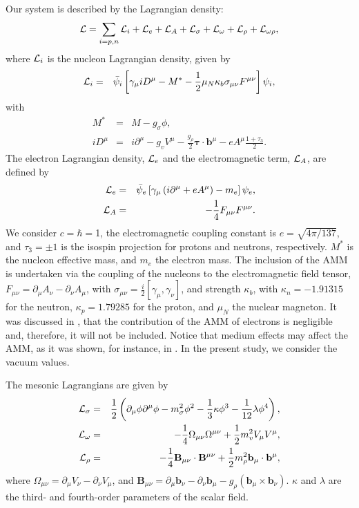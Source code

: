 \documentclass[epj]{svjour}
\begin{document}
Our system is described by the Lagrangian density:%
\begin{eqnarray}
{\cal L}=\sum_{i=p,n} {\cal L}_i + {\cal L}_e + {\cal L}_{A} + \cal L_\sigma + {\cal L}_\omega + {\cal L}_\rho + {\cal L}_{\omega\rho},
\end{eqnarray}
where ${\cal L}_i$ is the nucleon Lagrangian density, given by
\begin{eqnarray}
{\cal L}_i&=&\bar \psi_i\left[\gamma_\mu i D^\mu-M^*-\frac{1}{2}\mu_N\kappa_b\sigma_{\mu \nu} F^{\mu \nu}\right]\psi_i,
\end{eqnarray}
with
\begin{eqnarray}
M^*&=&M-g_\sigma\phi, \\
iD^\mu&=&i \partial^\mu-g_v V^\mu-
\frac{g_\rho}{2}\boldsymbol\tau \cdot \mathbf{b}^\mu - e A^\mu
\frac{1+\tau_3}{2}.
\end{eqnarray}
The electron Lagrangian density, ${\cal L}_e$ and the electromagnetic
term, ${\cal L}_{A}$, are defined  by
\begin{eqnarray}
{\cal L}_e&=&\bar \psi_e\left[\gamma_\mu\left(i\partial^\mu + e A^\mu\right)-m_e\right]\psi_e, \\
  {\cal L}_{A}&=&-\frac{1}{4}F_{\mu\nu}F^{\mu\nu}.
                  \label{lagr}
\end{eqnarray}
We consider $c=\hbar=$1, the electromagnetic coupling constant is $e=\sqrt{4\pi/137}$, and
$\tau_{3}=\pm 1$ is the
isospin projection for  protons and neutrons,
respectively. $M^*$ is the nucleon effective mass, and $m_e$ the electron mass. The inclusion of the AMM is undertaken via the coupling of the nucleons to the electromagnetic
field tensor, $F_{\mu\nu}=\partial_\mu A_\nu-\partial_\nu A_\mu$, with $\sigma_{\mu\nu}=\frac{i}{2}\left[\gamma_{\mu},
  \gamma_{\nu}\right] $, and strength $\kappa_{b}$, with
$\kappa_{n}=-1.91315$ for the neutron, $\kappa_{p}=1.79285$ for the
proton, and $\mu_N$ the nuclear magneton. It was discussed in
\cite{Duncan-00}, that the  contribution of the AMM of
electrons is negligible and, therefore, it will not be
included.  Notice that  medium effects may affect the AMM,
 as it was shown, for instance, in \cite{Frank1996}. In the present study, we consider
 the vacuum values.



The
mesonic  Lagrangians are given by
\begin{eqnarray}
{\cal L}_\sigma&=&\frac{1}{2}\left(\partial_\mu\phi\partial^\mu\phi-m_\sigma^2 \phi^2 - \frac{1}{3}\kappa \phi^3 -\frac{1}{12}\lambda\phi^4\right),\nonumber\\
{\cal L}_\omega&=&-\frac{1}{4}\Omega_{\mu\nu}\Omega^{\mu\nu}+\frac{1}{2}
m_v^2 V_\mu V^\mu, \nonumber \\
{\cal L}_\rho&=&-\frac{1}{4}\mathbf B_{\mu\nu}\cdot\mathbf B^{\mu\nu}+\frac{1}{2}
m_\rho^2 \mathbf b_\mu\cdot \mathbf b^\mu,
\end{eqnarray}
where
$\Omega_{\mu\nu}=\partial_\mu V_\nu-\partial_\nu V_\mu$, and $\mathbf B_{\mu\nu}=\partial_\mu\mathbf b_\nu-\partial_\nu \mathbf b_\mu
- g_\rho (\mathbf b_\mu \times \mathbf b_\nu)$. $\kappa$ and $\lambda$ are the third- and fourth-order parameters of the scalar field.  
\end{document}
